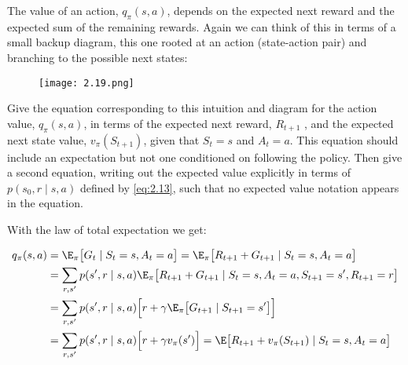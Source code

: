 \begin{exercise}
The value of an action, $q_\pi(s, a)$, depends on the expected next reward and the expected sum of the remaining rewards.
Again we can think of this in terms of a small backup diagram, this one rooted at an action (state-action pair) and branching to the possible next states:

\begin{figure}[H]
    \centering
    \texttt{[image: 2.19.png]}
    \caption{}
    \label{fig:2.19}
\end{figure}

Give the equation corresponding to this intuition and diagram for the action value, $q_\pi(s, a)$, in terms of the expected next reward, $R_{t+1}$ , and the expected next state value, $v_\pi(S_{t+1})$, given that $S_t = s$ and $A_t = a$.
This equation should include an expectation but not one conditioned on following the policy.
Then give a second equation, writing out the expected value explicitly in terms of $p(s_0, r \mid s, a)$ defined by \eqref{eq:2.13}, such that no expected value notation appears in the equation.

\end{exercise}

\begin{solution}
With the law of total expectation we get:

\begin{align*}
  q_\pi(s,a)
  &=
  \E_\pi\big[G_t\mid S_t = s, A_t = a\big]
  =
  \E_\pi\big[R_{t+1} + G_{t+1}\mid S_t = s, A_t = a\big] \\
  &=
  \sum_{r,s^\prime} p(s^\prime, r\mid s,a) \E_\pi\big[R_{t+1} + G_{t+1}\mid S_t = s, A_t = a, S_{t+1} = s^\prime, R_{t+1} = r\big] \\
  &=
  \sum_{r,s^\prime} p(s^\prime, r\mid s,a)\Big[r + \gamma \E_\pi\big[G_{t+1}\mid S_{t+1} = s^\prime\big] \Big]\\
  &=
  \sum_{r,s^\prime} p(s^\prime, r\mid s,a)\Big[r + \gamma v_\pi(s^\prime)\Big]
  =
  \E\big[R_{t+1} + v_\pi(S_{t+1})\mid S_t = s, A_t = a\big]
\end{align*}

\end{solution}
